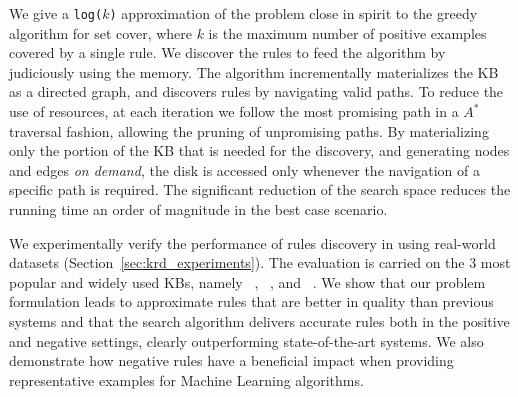 We give a \texttt{log($k$)} approximation of the problem close in spirit to the greedy algorithm for set cover, where $k$ is the maximum number of positive examples covered by a single rule. We discover the rules to feed the algorithm by judiciously using the memory. The algorithm incrementally 
materializes the KB as a directed graph, and discovers rules by navigating valid paths. To reduce the use of resources, at each iteration we follow the most promising path in a $A^*$ traversal fashion, allowing the pruning of unpromising paths.	
By materializing only the portion of the KB that is needed for the discovery, and generating nodes and edges \emph{on demand}, the disk is accessed only whenever the navigation of a specific path is required. 
The significant reduction of the search space reduces the running time an order of magnitude in the best case scenario. 



\vspace{1ex}
We experimentally verify the performance of rules discovery in \krd using real-world datasets (Section~\ref{sec:krd_experiments}). The evaluation is carried on the 3 most popular and widely used KBs, namely \dbpedia~\cite{bizer2009dbpedia}, \yago~\cite{suchanek2007yago}, and \wikidata~\cite{vrandevcic2014wikidata}. 
We show that our problem formulation leads to approximate rules that are better in quality than previous systems and that the search algorithm delivers accurate rules both in the positive and negative settings, clearly outperforming state-of-the-art systems. We also 
demonstrate how negative rules have a beneficial impact when providing representative examples for Machine Learning algorithms.
